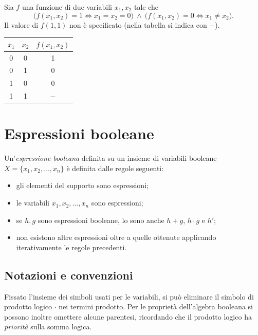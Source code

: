 \documentclass[11pt,a4paper]{article}
\begin{document}
\begin{esempio}
Sia $f$ una funzione di due variabili $x_1, x_2$ tale che
\[
  \bigl(f(x_1,x_2) = 1 \iff x_1 = x_2 = 0\bigr) \ \wedge\
  \bigl(f(x_1,x_2) = 0 \iff x_1 \neq x_2\bigr).
\]
Il valore di $f(1,1)$ non è specificato (nella tabella si indica con $-$).
\begin{center}
\begin{tabular}{cc|c}
$x_1$ & $x_2$ & $f(x_1,x_2)$ \\ \midrule
0 & 0 & 1 \\
0 & 1 & 0 \\
1 & 0 & 0 \\
1 & 1 & $-$
\end{tabular}
\end{center}
\end{esempio}

\section{Espressioni booleane}

\begin{definizione}
Un'\emph{espressione booleana} definita su un insieme di variabili booleane
$X = \{x_1, x_2, \dots, x_n\}$ è definita dalle regole seguenti:
\begin{itemize}
    \item gli elementi del supporto sono espressioni;
    \item le variabili $x_1, x_2, \dots, x_n$ sono espressioni;
    \item se $h, g$ sono espressioni booleane, lo sono anche $h + g$,
          $h \cdot g$ e $h'$;
    \item non esistono altre espressioni oltre a quelle ottenute applicando
          iterativamente le regole precedenti.
\end{itemize}
\end{definizione}

\subsection{Notazioni e convenzioni}

Fissato l'insieme dei simboli usati per le variabili, si può eliminare il
simbolo di prodotto logico $\cdot$ nei termini prodotto. Per le proprietà
dell'algebra booleana si possono inoltre omettere alcune parentesi, ricordando
che il prodotto logico ha \emph{priorità} sulla somma logica.
\end{document}
